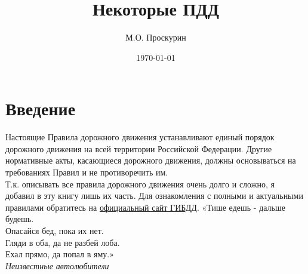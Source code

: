 \documentclass[russian,english,12pt,a4paper,reqno,dviphfm,oneside]{book}
\begin{document}
	
\title{Некоторые ПДД}
\author{М.О. Проскурин}
\date{\today}
\maketitle

\chapter*{Введение}
Настоящие Правила дорожного движения устанавливают единый порядок дорожного движения на всей территории Российской Федерации. Другие нормативные акты, касающиеся дорожного движения, должны основываться на требованиях Правил и не противоречить им.\\
Т.к. описывать все правила дорожного движения очень долго и сложно, я добавил в эту книгу лишь их часть. Для ознакомления с полными и актуальными правилами обратитесь на \href{http://www.gibdd.ru/docs/pprf/314/}{официальный сайт ГИБДД}.
\vspace{110pt}
{\flushright \Large{«Тише едешь - дальше будешь.\\
Опасайся бед, пока их нет.\\
Гляди в оба, да не разбей лоба.\\
Ехал прямо, да попал в яму.» \\} 
\normalsize {\textit {Неизвестные автолюбители\\}}
}
\end{document}
